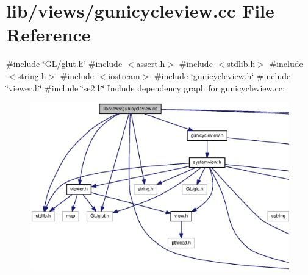 \section{lib/views/gunicycleview.cc \-File \-Reference}
\label{gunicycleview_8cc}
{\ttfamily \#include \char`\"{}\-G\-L/glut.\-h\char`\"{}}\*
{\ttfamily \#include $<$assert.\-h$>$}\*
{\ttfamily \#include $<$stdlib.\-h$>$}\*
{\ttfamily \#include $<$string.\-h$>$}\*
{\ttfamily \#include $<$iostream$>$}\*
{\ttfamily \#include \char`\"{}gunicycleview.\-h\char`\"{}}\*
{\ttfamily \#include \char`\"{}viewer.\-h\char`\"{}}\*
{\ttfamily \#include \char`\"{}se2.\-h\char`\"{}}\*
\-Include dependency graph for gunicycleview.\-cc\-:
\nopagebreak
\begin{figure}[H]
\begin{center}
\leavevmode
\includegraphics[width=350pt]{gunicycleview_8cc__incl}
\end{center}
\end{figure}
